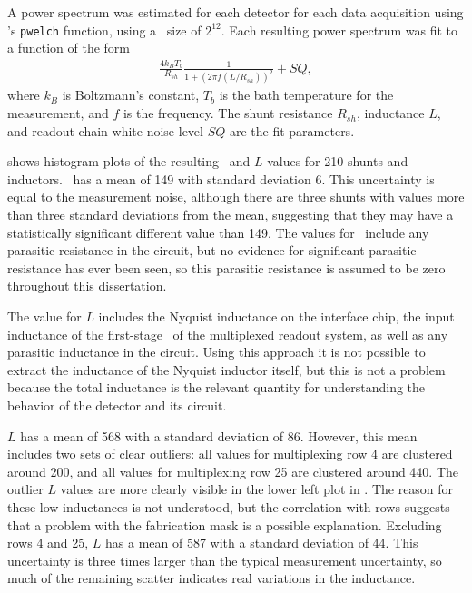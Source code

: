 A power spectrum was estimated for each detector for each data acquisition using \MATLAB's \texttt{pwelch} function, using a \FFT\ size of $2^{12}$.
Each resulting power spectrum was fit to a function of the form
\begin{eqnarray}\label{eqn:scnoise-fit}
	\frac{4 k_B T_b}{R_{sh}} \frac{1}{1 + (2 \pi f (L/R_{sh}))^2} + SQ,
\end{eqnarray}
where $k_B$ is Boltzmann's constant, $T_b$ is the bath temperature for the measurement, and $f$ is the frequency.
The shunt resistance $R_{sh}$, inductance $L$, and readout chain white noise level $SQ$ are the fit parameters.

 shows histogram plots of the resulting \Rsh\ and $L$ values for 210 shunts and inductors.
\Rsh\ has a mean of \SI{149}{\uOhm} with standard deviation \SI{6}{\uOhm}.
This uncertainty is equal to the measurement noise, although there are three shunts with values more than three standard deviations from the mean, suggesting that they may have a statistically significant different value than \SI{149}{\uOhm}.
The values for \Rsh\ include any parasitic resistance in the circuit, but no evidence for significant parasitic resistance has ever been seen, so this parasitic resistance is assumed to be zero throughout this dissertation.

The value for $L$ includes the Nyquist inductance on the interface chip, the input inductance of the first-stage \SQUID\ of the multiplexed readout system, as well as any parasitic inductance in the circuit.
Using this approach it is not possible to extract the inductance of the Nyquist inductor itself, but this is not a problem because the total inductance is the relevant  quantity for understanding the behavior of the detector and its circuit.

$L$ has a mean of \SI{568}{\nH} with a standard deviation of \SI{86}{\nH}.
However, this mean includes two sets of clear outliers: all values for multiplexing row 4 are clustered around \SI{200}{\nH}, and all values for multiplexing row 25 are clustered around \SI{440}{\nH}.
The outlier $L$ values are more clearly visible in the lower left plot in .
The reason for these low inductances is not understood, but the correlation with rows suggests that a problem with the fabrication mask is a possible explanation.
Excluding rows 4 and 25,  $L$ has a mean of \SI{587}{\nH} with a standard deviation of \SI{44}{\nH}.
This uncertainty is three times larger than the typical measurement uncertainty, so much of the remaining scatter indicates real variations in the inductance.

